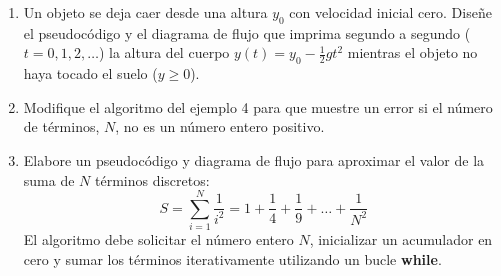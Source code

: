 \documentclass[12pt]{article}
\begin{document}
\begin{problemas}[]
\begin{enumerate}
        \item Un objeto se deja caer desde una altura $y_0$ con velocidad 
        inicial cero. Diseñe el pseudocódigo y el diagrama de flujo que 
        imprima segundo a segundo ($t = 0, 1, 2, \dots$) la altura del 
        cuerpo $y(t) = y_0 - \frac{1}{2}gt^2$ mientras el 
        objeto no haya tocado el suelo ($y \ge 0$).

        \item Modifique el algoritmo del ejemplo 4 para que muestre un error si
         el número de términos, $N$, no es un número entero positivo.
        \item Elabore un pseudocódigo y diagrama de flujo para aproximar 
        el valor de la suma de $N$ términos discretos:
        \[
            S = \sum_{i=1}^{N} \frac{1}{i^2} = 1 + \frac{1}{4} + \frac{1}{9} + \dots + \frac{1}{N^2}
        \]
        El algoritmo debe solicitar el número entero $N$, 
        inicializar un acumulador en cero y sumar los términos 
        iterativamente utilizando un bucle \textbf{while}.
    \end{enumerate}
\end{problemas}
\end{document}
